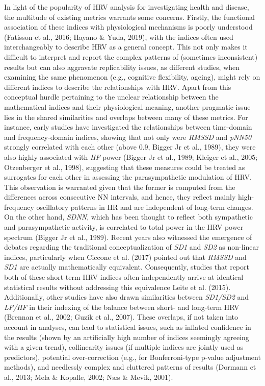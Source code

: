 \documentclass[
  english,
  jou,floatsintext]{apa6}
\begin{document}
In light of the popularity of HRV analysis for investigating health and disease, the multitude of existing metrics warrants some concerns. Firstly, the functional association of these indices with physiological mechanisms is poorly understood (Fatisson et al., 2016; Hayano \& Yuda, 2019), with the indices often used interchangeably to describe HRV as a general concept. This not only makes it difficult to interpret and report the complex patterns of (sometimes inconsistent) results but can also aggravate replicability issues, as different studies, when examining the same phenomenon (e.g., cognitive flexibility, ageing), might rely on different indices to describe the relationships with HRV. Apart from this conceptual hurdle pertaining to the unclear relationship between the mathematical indices and their physiological meaning, another pragmatic issue lies in the shared similarities and overlaps between many of these metrics. For instance, early studies have investigated the relationships between time-domain and frequency-domain indices, showing that not only were \emph{RMSSD} and \emph{pNN50} strongly correlated with each other (above 0.9, Bigger Jr et al., 1989), they were also highly associated with \emph{HF} power (Bigger Jr et al., 1989; Kleiger et al., 2005; Otzenberger et al., 1998), suggesting that these measures could be treated as surrogates for each other in assessing the parasympathetic modulation of HRV. This observation is warranted given that the former is computed from the differences across consecutive NN intervals, and hence, they reflect mainly high-frequency oscillatory patterns in HR and are independent of long-term changes. On the other hand, \emph{SDNN}, which has been thought to reflect both sympathetic and parasympathetic activity, is correlated to total power in the HRV power spectrum (Bigger Jr et al., 1989). Recent years also witnessed the emergence of debates regarding the traditional conceptualization of \emph{SD1} and \emph{SD2} as non-linear indices, particularly when Ciccone et al. (2017) pointed out that \emph{RMSSD} and \emph{SD1} are actually mathematically equivalent. Consequently, studies that report both of these short-term HRV indices often independently arrive at identical statistical results without addressing this equivalence Leite et al. (2015). Additionally, other studies have also drawn similarities between \emph{SD1/SD2} and \emph{LF/HF} in their indexing of the balance between short- and long-term HRV (Brennan et al., 2002; Guzik et al., 2007). These overlaps, if not taken into account in analyses, can lead to statistical issues, such as inflated confidence in the results (shown by an artificially high number of indices seemingly agreeing with a given trend), collinearity issues (if multiple indices are jointly used as predictors), potential over-correction (e.g., for Bonferroni-type p-value adjustment methods), and needlessly complex and cluttered patterns of results (Dormann et al., 2013; Mela \& Kopalle, 2002; Næs \& Mevik, 2001).
\end{document}
